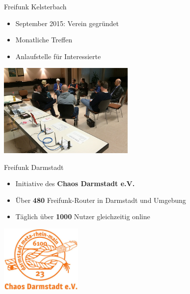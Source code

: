 \documentclass[t]{beamer}
\begin{document}
  \begin{frame}{Freifunk Kelsterbach}
    \begin{itemize}
      \item September 2015: Verein gegründet
      \item Monatliche Treffen
      \item Anlaufstelle für Interessierte
    \end{itemize}
    \begin{center}
      \vspace{1em}
      \includegraphics[width=0.5\textwidth]{images/ffkelsterbach-infoveranstaltung}
    \end{center}
  \end{frame}

  \begin{frame}{Freifunk Darmstadt}
    \begin{itemize}
      \item Initiative des \textbf{Chaos Darmstadt e.V.}
      \item Über \textbf{480} Freifunk-Router in Darmstadt und Umgebung
      \item Täglich über \textbf{1000} Nutzer gleichzeitig online
    \end{itemize}
    \begin{center}
      \vspace{1em}
      \includegraphics[width=0.3\textwidth]{images/cda_transparent}
    \end{center}
  \end{frame}
\end{document}

